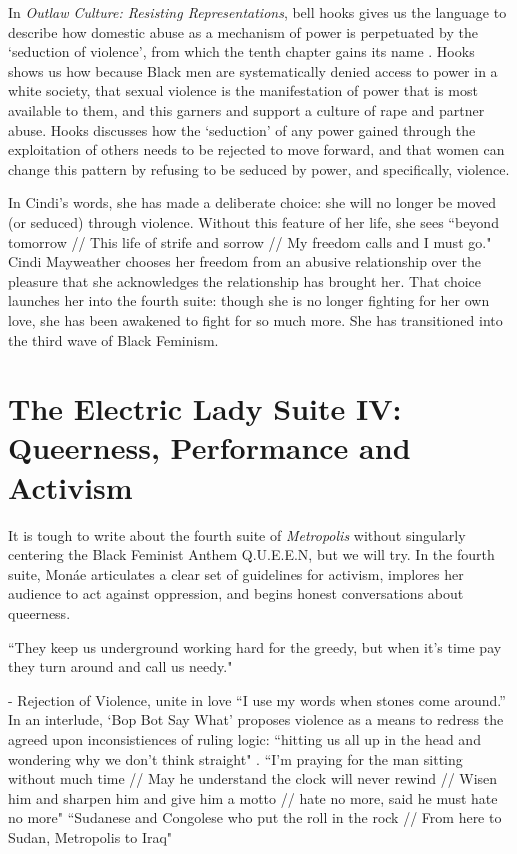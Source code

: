 \documentclass[a4paper, 11pt]{article} %
\begin{document}
In \emph{Outlaw Culture: Resisting Representations}, bell hooks gives us the language to describe how domestic abuse as a mechanism of power is perpetuated by the `seduction of violence', from which the tenth chapter gains its name \cite{hooks1994outlaw}.
Hooks shows us how because Black men are systematically denied access to power in a white society, that sexual violence is the manifestation of power that is most available to them, and this garners and support a culture of rape and partner abuse.
Hooks discusses how the `seduction' of any power gained through the exploitation of others needs to be rejected to move forward, and that women can change this pattern by refusing to be seduced by power, and specifically, violence.

In Cindi's words, she has made a deliberate choice: she will no longer be moved (or seduced) through violence. 
Without this feature of her life, she sees ``beyond tomorrow // This life of strife and sorrow // My freedom calls and I must go." \cite{babopbyeya}
Cindi Mayweather chooses her freedom from an abusive relationship over the pleasure that she acknowledges the relationship has brought her.
That choice launches her into the fourth suite: though she is no longer fighting for her own love, she has been awakened to fight for so much more. 
She has transitioned into the third wave of Black Feminism.



\section*{The Electric Lady Suite IV: Queerness, Performance and Activism}

It is tough to write about the fourth suite of \emph{Metropolis} without singularly centering the Black Feminist Anthem Q.U.E.E.N, but we will try.
In the fourth suite, Mon\'ae articulates a clear set of guidelines for activism, implores her audience to act against oppression, and begins honest conversations about queerness.


``They keep us underground working hard for the greedy, but when it's time pay they turn around and call us needy." \cite{queen}

- Rejection of Violence, unite in love
``I use my words when stones come around.'' \cite{manymoons}
In an interlude, `Bop Bot Say What' proposes violence as a means to redress the agreed upon inconsistiences of ruling logic: ``hitting us all up in the head and wondering why we don't think straight" \cite{chromeshoppe}.
``I'm praying for the man sitting without much time // May he understand the clock will never rewind // Wisen him and sharpen him and give him a motto // hate no more, said he must hate no more" \cite{danceordie}
``Sudanese and Congolese who put the roll in the rock // From here to Sudan, Metropolis to Iraq" \cite{danceordie}
\end{document}
